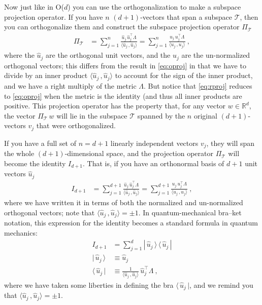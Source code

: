 \documentclass{article}
\newcommand{\inner}[2]{\langle{#1}\,,{#2}\rangle}
\newcommand{\bra}[1]{\langle\,{#1}\,|}
\newcommand{\ket}[1]{|\,{#1}\,\rangle}
\newcommand{\ketbra}[2]{|\,{#1}\,\rangle\,\langle\,{#2}\,|}
\newcommand{\plus}{\!+\!} %
\begin{document}
Now just like in O($d$) you can use the orthogonalization to make a subspace projection operator.
If you have $n$ $(d+1)$-vectors that span a subspace $\mathscr{T}$, then you can orthogonalize them and construct the subspace projection operator $\Pi_\mathscr{T}$
\begin{align}\label{eq:rproj}
    \Pi_\mathscr{T} &= \sum_{j=1}^n \frac{\hat{u}_j\,\hat{u}_j^\top\Lambda}{\inner{\hat{u}_j}{\hat{u}_j}} = \sum_{j=1}^n \frac{u_j\,u_j^\top\Lambda}{\inner{u_j}{u_j}} ~,
\end{align}
where the $\hat{u}_j$ are the orthogonal unit vectors, and the $u_j$ are the un-normalized orthogonal vectors; this differs from the result in \eqref{eq:oproj} in that we have to divide by an inner product $\inner{\hat{u}_j}{\hat{u}_j}$ to account for the sign of the inner product, and we have a right multiply of the metric $\Lambda$.
But notice that \eqref{eq:rproj} reduces to \eqref{eq:oproj} when the metric is the identity (and thus all inner products are positive.
This projection operator has the property that, for any vector $w\in\mathbb{R}^d$, the vector $\Pi_\mathscr{T}\,w$ will lie in the subspace $\mathscr{T}$ spanned by the $n$ original $(d\plus1)$-vectors $v_j$ that were orthogonalized.

If you have a full set of $n=d+1$ linearly independent vectors $v_j$, they will span the whole $(d\plus1)$-dimensional space, and the projection operator $\Pi_\mathscr{T}$ will become the identity $I_{d\plus1}$.
That is, if you have an orthonormal basis of $d+1$ unit vectors $\hat{u}_j$
\begin{align}
    I_{d\plus1} &= \sum_{j=1}^{d+1} \frac{\hat{u}_j\,\hat{u}_j^\top\Lambda}{\inner{\hat{u}_j}{\hat{u}_j}} = \sum_{j=1}^{d+1} \frac{u_j\,u_j^\top\Lambda}{\inner{u_j}{u_j}} ~,
\end{align}
where we have written it in terms of both the normalized and un-normalized orthogonal vectors; note that $\inner{\hat{u}_j}{\hat{u}_j}=\pm 1$.
In quantum-mechanical bra--ket notation, this expression for the identity becomes a standard formula in quantum mechanics:
\begin{align}
    I_{d\plus1} &= \sum_{j=1}^d \ketbra{\hat{u}_j}{\hat{u}_j}
    \\
    \ket{\hat{u}_j} &\equiv \hat{u}_j
    \\
    \bra{\hat{u}_j} &\equiv \frac{1}{\inner{\hat{u}_j}{\hat{u}_j}}\,\hat{u}_j^\top\Lambda ~,
\end{align}
where we have taken some liberties in defining the bra $\bra{\hat{u}_j}$, and we remind you that $\inner{\hat{u}_j}{\hat{u}_j}=\pm 1$.
\end{document}
